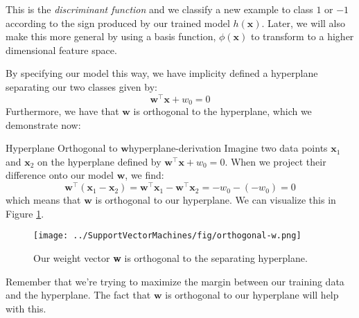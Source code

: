 This is the {\em discriminant function} and we classify a new example to class $1$ or $-1$ according to the sign produced by our trained model $h(\textbf{x})$. Later, we will also make this more general by using a basis function, 
$\phi(\mathbf{x})$ to transform to a higher dimensional feature space.

By specifying our model this way, we have implicity defined a hyperplane separating our two classes given by:
\begin{equation} \label{implicit-hyperplane}
	\textbf{w}^\top \textbf{x} + w_{0} = 0
\end{equation}
Furthermore, we have that $\textbf{w}$ is orthogonal to the hyperplane, which we demonstrate now:

\begin{derivation}{Hyperplane Orthogonal to $\textbf{w}$}{hyperplane-derivation}
	Imagine two data points $\mathbf{x}_{1}$ and $\mathbf{x}_{2}$ on the hyperplane defined by $\textbf{w}^\top \textbf{x} + w_{0} = 0$. When we project their difference onto our model $\textbf{w}$, we find:
	\begin{equation} \label{hyperplane-eqn}
		\textbf{w}^\top(\textbf{x}_{1} - \textbf{x}_{2}) = \textbf{w}^\top\textbf{x}_{1} - \textbf{w}^\top\textbf{x}_{2} = -w_{0} - (-w_{0}) = 0
	\end{equation}
	which means that $\textbf{w}$ is orthogonal to our hyperplane. We can visualize this in Figure \ref{fig:orthogonal-w}.
\end{derivation}

\begin{figure}
    \centering
    \texttt{[image: ../SupportVectorMachines/fig/orthogonal-w.png]}
    \caption{Our weight vector \textbf{w} is orthogonal to the separating hyperplane.}
    \label{fig:orthogonal-w}
\end{figure}

Remember that we're trying to maximize the margin between our training data and the hyperplane. The fact that $\textbf{w}$ is orthogonal to our hyperplane will help with this.


